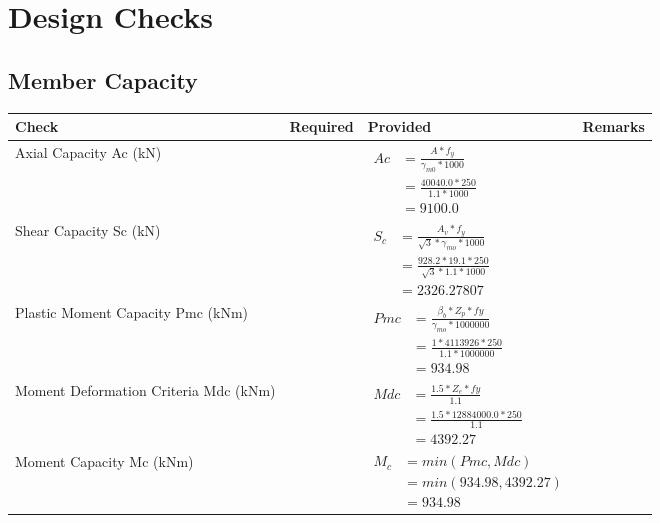\documentclass{article}%
\begin{document}
%
%
\newpage%
\section{Design Checks}%
\label{sec:DesignChecks}%
\subsection{Member Capacity}%
\label{subsec:MemberCapacity}%
\renewcommand{\arraystretch}{1.2}%
\begin{longtable}{|p{4cm}|p{5cm}|p{5.5cm}|p{1.5cm}|}%
\hline%
\rowcolor{OsdagGreen}%
Check&Required&Provided&Remarks\\%
\hline%
\endhead%
\hline%
Axial Capacity Ac (kN)&&$\begin{aligned} Ac &=\frac{A*f_y}{\gamma_{m0} *1000}\\ &=\frac{40040.0*250}{1.1* 1000}\\ &=9100.0\end{aligned}$&\\%
\hline%
Shear Capacity Sc (kN)&&$\begin{aligned} S_c &= \frac{A_v*f_y}{\sqrt{3}*\gamma_{mo} *1000}\\ &=\frac{928.2*19.1*250}{\sqrt{3}*1.1 *1000}\\ &=2326.27807\end{aligned}$&\\%
\hline%
Plastic Moment Capacity Pmc (kNm)&&$\begin{aligned} Pmc &= \frac{\beta_b * Z_p *fy}{\gamma_{mo} * 1000000}\\ &=\frac{1*4113926*250}{1.1 * 1000000}\\ &=934.98\end{aligned}$&\\%
\hline%
Moment Deformation Criteria Mdc (kNm)&&$\begin{aligned} Mdc &= \frac{1.5 *Z_e *fy}{1.1}\\ &= \frac{1.5 *12884000.0*250}{1.1}\\ &= 4392.27\end{aligned}$&\\%
\hline%
Moment Capacity Mc (kNm)&&$\begin{aligned} M_c &= min(Pmc,Mdc)\\ &=min(934.98,4392.27)\\ &=934.98\end{aligned}$&\\%
\hline%
\end{longtable}
\end{document}
